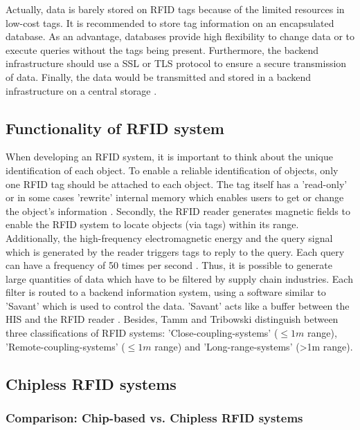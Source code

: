 Actually, data is barely stored on RFID tags because of the limited resources in low-cost tags. It is recommended \cite{henrici} to store tag information on an encapsulated database. As an advantage, databases provide high flexibility to change data or to execute queries without the tags being present. Furthermore, the backend infrastructure should use a \ac{SSL} or \ac{TLS} protocol to ensure a secure transmission of data. Finally, the data would be transmitted and stored in a backend infrastructure on a central storage \cite{henrici}.

\subsection{Functionality of RFID system} \label{chipless}

When developing an RFID system, it is important to think about the unique identification of each object. To enable a reliable identification of objects, only one RFID tag should be attached to each object. The tag itself has a 'read-only' or in some cases 'rewrite' internal memory which enables users to get or change the object's information \cite{ncbi}. 
Secondly, the RFID reader generates magnetic fields to enable the RFID system to locate objects (via tags) within its range. Additionally, the high-frequency electromagnetic energy and the query signal which is generated by the reader triggers tags to reply to the query. Each query can have a frequency of 50 times per second \cite{ncbi}. Thus, it is possible to generate large quantities of data which have to be filtered by supply chain industries. Each filter is routed to a backend information system, using a software similar to 'Savant' which is used to control the data. 'Savant' acts like a buffer between the \ac{HIS} and the RFID reader \cite{ncbi}.
Besides, Tamm and Tribowski \cite[p.18 ff.]{fokus} distinguish between three classifications of RFID systems: 'Close-coupling-systems' ($\le1m$ range), 'Remote-coupling-systems' ($\le1m$ range) and 'Long-range-systems' (>1m range). 

\subsection{Chipless RFID systems}

\subsubsection{Comparison: Chip-based vs. Chipless RFID systems} 

